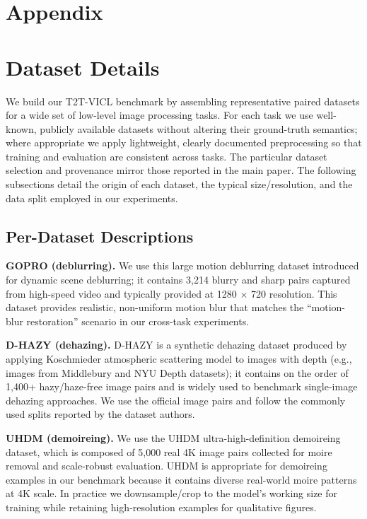 \clearpage

\section*{Appendix}
\label{sec:appendix}

\section{Dataset Details}
\label{sec:data}

We build our T2T-VICL benchmark by assembling representative paired datasets for a wide set of low-level image processing tasks. For each task we use well-known, publicly available datasets without altering their ground-truth semantics; where appropriate we apply lightweight, clearly documented preprocessing so that training and evaluation are consistent across tasks. The particular dataset selection and provenance mirror those reported in the main paper. The following subsections detail the origin of each dataset, the typical size\slash resolution, and the data split employed in our experiments.

\subsection{Per-Dataset Descriptions}
\noindent \textbf{GOPRO (deblurring).} We use this large motion deblurring dataset introduced for dynamic scene deblurring; it contains 3,214 blurry and sharp pairs captured from high-speed video and typically provided at 1280 $\times$ 720 resolution. This dataset provides realistic, non-uniform motion blur that matches the ``motion-blur restoration'' scenario in our cross-task experiments.

\noindent \textbf{D-HAZY (dehazing).} D-HAZY is a synthetic dehazing dataset produced by applying Koschmieder atmospheric scattering model to images with depth (e.g., images from Middlebury and NYU Depth datasets); it contains on the order of 1,400+ hazy\slash haze-free image pairs and is widely used to benchmark single-image dehazing approaches. We use the official image pairs and follow the commonly used splits reported by the dataset authors.

\noindent \textbf{UHDM (demoireing).} We use the UHDM ultra-high-definition demoireing dataset, which is composed of 5,000 real 4K image pairs collected for moire removal and scale-robust evaluation. UHDM is appropriate for demoireing examples in our benchmark because it contains diverse real-world moire patterns at 4K scale. In practice we downsample/crop to the model's working size for training while retaining high-resolution examples for qualitative figures.

